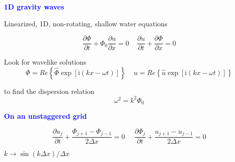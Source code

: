 \documentclass[a4]{seminar}
\newcommand{\ii}{\mathrm{i}}
\newcommand{\B}[1]{\textcolor{blue}{#1}}
\begin{document}

\begin{slide}

\B{\bf 1D gravity waves}

\vspace{6mm}

Linearized, 1D, non-rotating, shallow water equations

\begin{displaymath}
\frac{\partial \Phi}{\partial t} + \Phi_0 \frac{\partial u}{\partial x} = 0
\ \ \ \ \ 
\frac{\partial u}{\partial t} + \frac{\partial \Phi}{\partial x} = 0
\end{displaymath}

\vspace{2mm}

Look for wavelike solutions
\begin{displaymath}
\Phi = Re \left\{ \hat{\Phi} \exp[\ii(kx - \omega t)]\right\}
\ \ \ \ \ 
u = Re \left\{ \hat{u} \exp[\ii(kx - \omega t)]\right\}
\end{displaymath}

to find the dispersion relation
\begin{displaymath}
\omega^2 = k^2 \Phi_0
\end{displaymath}


\end{slide}


\begin{slide}

\B{\bf On an unstaggered grid}

\vspace{2mm}

\begin{displaymath}
\frac{\partial u_j}{\partial t} + \frac{\Phi_{j+1} - \Phi_{j-1}}{2 \Delta x} = 0
\ \ \ \ \ \ 
\frac{\partial \Phi_j}{\partial t} + \frac{u_{j+1} - u_{j-1}}{2 \Delta x} = 0
\end{displaymath}

\vspace{3mm}
\hspace{20mm} \( k \rightarrow \sin (k \Delta x) / \Delta x \)
\vspace{3mm}

\begin{center}
\end{center}



\end{slide}
\end{document}
